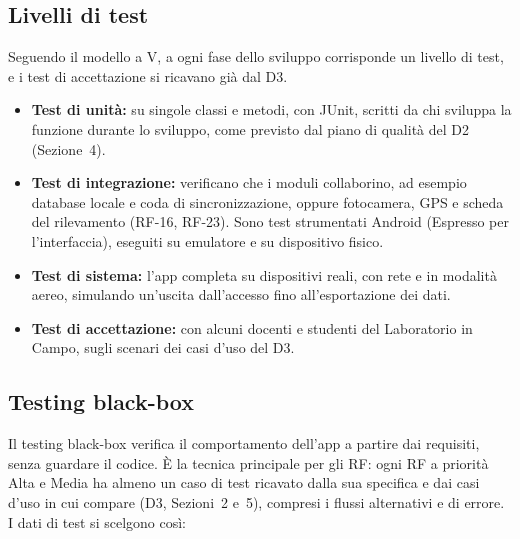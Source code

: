 \subsection{Livelli di test}

Seguendo il modello a V, a ogni fase dello sviluppo corrisponde un livello di test, e i test di accettazione si ricavano già dal D3.

\begin{itemize}
    \item \textbf{Test di unità:} su singole classi e metodi, con JUnit, scritti da chi sviluppa la funzione durante lo sviluppo, come previsto dal piano di qualità del D2 (Sezione~4).
    \item \textbf{Test di integrazione:} verificano che i moduli collaborino, ad esempio database locale e coda di sincronizzazione, oppure fotocamera, GPS e scheda del rilevamento (RF-16, RF-23). Sono test strumentati Android (Espresso per l'interfaccia), eseguiti su emulatore e su dispositivo fisico.
    \item \textbf{Test di sistema:} l'app completa su dispositivi reali, con rete e in modalità aereo, simulando un'uscita dall'accesso fino all'esportazione dei dati.
    \item \textbf{Test di accettazione:} con alcuni docenti e studenti del Laboratorio in Campo, sugli scenari dei casi d'uso del D3.
\end{itemize}

\subsection{Testing black-box}

Il testing black-box verifica il comportamento dell'app a partire dai requisiti, senza guardare il codice. È la tecnica principale per gli RF: ogni RF a priorità Alta e Media ha almeno un caso di test ricavato dalla sua specifica e dai casi d'uso in cui compare (D3, Sezioni~2 e~5), compresi i flussi alternativi e di errore. I dati di test si scelgono così:

